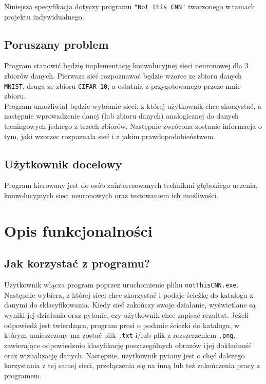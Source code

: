 \documentclass[a4paper,12pt]{article}
\begin{document}
Niniejsza specyfikacja dotyczy programu \texttt{"Not this CNN"} tworzonego w\,ramach projektu indywidualnego.

\subsection{Poruszany problem}

Program stanowić będzię implementację konwolucyjnej sieci neuronowej dla 3 zbiorów danych. Pierwsza sieć rozpoznawać będzie wzorce ze zbioru danych \texttt{MNIST}, druga ze zbioru \texttt{CIFAR-10}, a ostatnia z przygotowanego przeze mnie zbioru.\\

Program umożliwiał będzie wybranie sieci, z której użytkownik chce skorzystać, a następnie wprowadzenie danej (lub zbioru danych) analogicznej do danych treningowych jednego z trzech zbiorów. Następnie zwrócona zostanie informacja o tym, jaki wzorzec rozpoznała sieć i z jakim prawdopodobieństwem.
 
\subsection{Użytkownik docelowy}

Program kierowany jest do osób zainteresowanych technikmi głębokiego uczenia, konwolucyjnych sieci neuronowych oraz testowaniem ich możliwości.
 
\section{Opis funkcjonalności}

\subsection{Jak korzystać z programu?}

Użytkownik włącza program poprzez uruchomienie pliku \texttt{notThisCNN.exe}. Następnie wybiera, z której sieci chce skorzystać i podaje ścieżkę do katalogu z danymi do sklasyfikowania. Kiedy sieć zakończy swoje działanie, wyświetlane są wyniki jej działania oraz pytanie, czy użytkownik chce zapisać rezultat. Jeżeli odpowiedź jest twierdząca, program prosi o podanie ścieżki do katalogu, w którym umieszczony ma zostać plik \texttt{.txt} i/lub plik z rozszerzeniem \texttt{.png}, zawierające odpowiedznio klasyfikację poszczególnych obrazów i\,jej dokładność oraz wizualizację danych. Następnie, użytkownik pytany jest o chęć dalszego korzystania z tej samej sieci, przełączenia się na inną lub też zakończenia pracy z programem.
\end{document}
